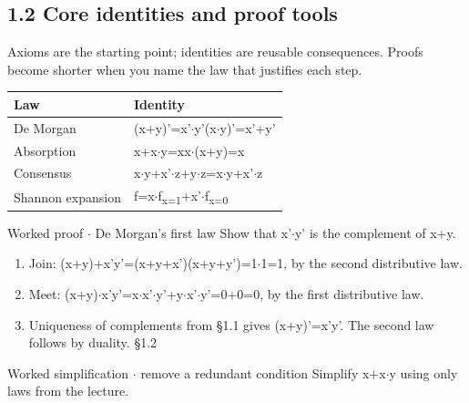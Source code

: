\documentclass[11pt]{article}
\begin{document}
\begin{keepsection}
\section{1.2 Core identities and proof tools}

Axioms are the starting point; identities are reusable consequences. Proofs become shorter when you name the law that justifies each step.

\begin{center}\small\begin{tabularx}{\linewidth}{>{\raggedright\arraybackslash}X>{\raggedright\arraybackslash}X}\toprule
\textbf{Law} & \textbf{Identity} \\ \midrule
De Morgan & (x+y)'=x'\ensuremath{\cdot}y'(x\ensuremath{\cdot}y)'=x'+y' \\
Absorption & x+x\ensuremath{\cdot}y=xx\ensuremath{\cdot}(x+y)=x \\
Consensus & x\ensuremath{\cdot}y+x'\ensuremath{\cdot}z+y\ensuremath{\cdot}z=x\ensuremath{\cdot}y+x'\ensuremath{\cdot}z \\
Shannon expansion & f=x\ensuremath{\cdot}f\textsubscript{x=1}+x'\ensuremath{\cdot}f\textsubscript{x=0} \\
\bottomrule\end{tabularx}\end{center}

\begin{workedbox}{Worked proof \ensuremath{\cdot} De Morgan’s first law}
Show that x'\ensuremath{\cdot}y' is the complement of x+y.

\begin{enumerate}
\item Join: (x+y)+x'y'=(x+y+x')(x+y+y')=1\ensuremath{\cdot}1=1, by the second distributive law.
\item Meet: (x+y)\ensuremath{\cdot}x'y'=x\ensuremath{\cdot}x'\ensuremath{\cdot}y'+y\ensuremath{\cdot}x'\ensuremath{\cdot}y'=0+0=0, by the first distributive law.
\item Uniqueness of complements from §1.1 gives (x+y)'=x'y'. The second law follows by duality. \hfill{\small\color{FAUblue}§1.2}
\end{enumerate}
\end{workedbox}

\begin{workedbox}{Worked simplification \ensuremath{\cdot} remove a redundant condition}
Simplify x+x\ensuremath{\cdot}y using only laws from the lecture.


\end{workedbox}
\end{keepsection}
\end{document}
